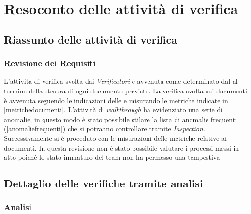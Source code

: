 \section{Resoconto delle attività di verifica}

	\subsection{Riassunto delle attività di verifica}
	\label{RiassuntoAttivitaVerifica}
	
	 	\subsubsection{Revisione dei Requisiti}
	 	L'attività di verifica svolta dai \emph{Verificatori} è avvenuta come determinato dal \PianoDiProgetto al termine della stesura di ogni documento previsto. La verifica svolta sui documenti è avvenuta seguendo le indicazioni delle \NormeDiProgetto e misurando le metriche indicate in \ref{metrichedocumenti}. L'attività di \emph{walkthrough} ha evidenziato una serie di anomalie, in questo modo è stato possibile stilare la lista di anomalie frequenti (\ref{anomaliefrequenti}) che si potranno controllare tramite \emph{Inspection}. Successivamente si è proceduto con le misurazioni delle metriche relative ai documenti.
In questa revisione non è stato possibile valutare i processi messi in atto poiché lo stato immaturo del team non ha permesso una tempestiva 
	 
	 \subsection{Dettaglio delle verifiche tramite analisi}
	 \label{DettaglioVerificheAnalisi}
	 	\subsubsection{Analisi}
	 	
	 
	 


	
